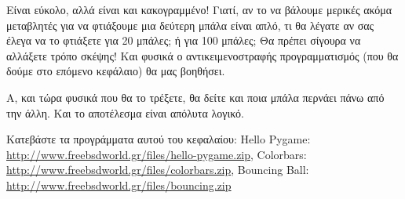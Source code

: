 Είναι εύκολο, αλλά είναι και κακογραμμένο! Γιατί, αν το να βάλουμε
μερικές ακόμα μεταβλητές για να φτιάξουμε μια δεύτερη μπάλα είναι απλό, τι
θα λέγατε αν σας έλεγα να το φτιάξετε για 20 μπάλες; ή για 100 μπάλες;
Θα πρέπει σίγουρα να αλλάξετε τρόπο σκέψης! Και φυσικά ο αντικειμενοστραφής
προγραμματισμός (που θα δούμε στο επόμενο κεφάλαιο) θα μας βοηθήσει.

Α, και τώρα φυσικά που θα το τρέξετε, θα δείτε και ποια μπάλα περνάει πάνω
από την άλλη. Και το αποτέλεσμα είναι απόλυτα λογικό.

Κατεβάστε τα προγράμματα αυτού του κεφαλαίου: Hello Pygame: \url{http://www.freebsdworld.gr/files/hello-pygame.zip}, Colorbars: \url{http://www.freebsdworld.gr/files/colorbars.zip}, Bouncing Ball: \url{http://www.freebsdworld.gr/files/bouncing.zip}
